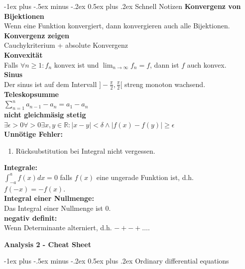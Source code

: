 \documentclass[10pt,landscape]{article}
\makeatletter
\renewcommand{\section}{\@startsection{section}{1}{0mm}%
                                {-1ex plus -.5ex minus -.2ex}%
                                {0.5ex plus .2ex}%
                                {\normalfont\large\bfseries}}
\makeatother
\begin{document}
\begin{multicols}{3}
\section{Schnell Notizen}
\textbf{Konvergenz von Bijektionen}\\
Wenn eine Funktion konvergiert, dann konvergieren auch alle Bijektionen.\\
\textbf{Konvergenz zeigen}\\
Cauchykriterium + absolute Konvergenz\\
\textbf{Konvexität}\\
Falls $\forall n \geq 1: f_n$ konvex ist und $\lim_{n \rightarrow \infty} f_n = f$, dann ist $f$ auch konvex.\\
\textbf{Sinus}\\
Der sinus ist auf dem Intervall $]-\frac{\pi}{2},\frac{\pi}{2}[$ streng monoton wachsend.\\
\textbf{Teleskopsumme}\\
$\sum_{n = 1}^{n} a_{n - 1} - a_{n} = a_1 - a_n$\\
\textbf{nicht gleichmäsig stetig}\\
$\exists\epsilon > 0 \forall > 0 \exists x,y \in \mathbb{R}: |x - y| < \delta \land |f(x) - f(y)| \geq \epsilon$\\
\textbf{Unnötige Fehler:}
\begin{enumerate}
        \item Rücksubstitution bei Integral nicht vergessen.
\end{enumerate}
\textbf{Integrale:}\\
$\int_{-a}^{a} f(x) dx = 0$ falls $f(x)$ eine ungerade Funktion ist, d.h. $f(-x) = -f(x)$.\\
\textbf{Integral einer Nullmenge:}\\
Das Integral einer Nullmenge ist 0.\\
\textbf{negativ definit:}\\
Wenn Determinante alterniert, d.h. $- + - + \dots$.
\newpage
\begin{center}
        \Large{\textbf{Analysis 2 - Cheat Sheet}} \\
\end{center}
\section{Ordinary differential equations}

\end{multicols}
\end{document}
